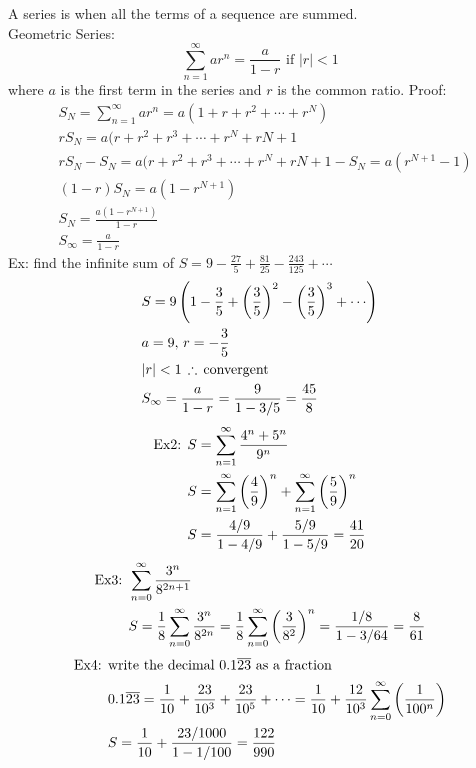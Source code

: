 \documentclass[11pt, fleqn]{article}
\begin{document}
A series is when all the terms of a sequence are summed.\\
Geometric Series:
$$\sum_{n=1}^\infty ar^n=\frac{a}{1-r}\text{ if $|r|<1$}$$
where $a$ is the first term in the series and $r$ is the common ratio.
Proof:
\begin{align*}
    &S_N=\sum_{n=1}^\infty ar^n=a(1+r+r^2+\cdots+r^N)\\
    &rS_N=a(r+r^2+r^3+\cdots+r^N+r{N+1}\\
    &rS_N-S_N=a(r+r^2+r^3+\cdots+r^N+r{N+1}-S_N=a(r^{N+1}-1)\\
    &(1-r)S_N=a(1-r^{N+1})\\
    &S_N=\frac{a(1-r^{N+1})}{1-r}\\
    &S_\infty=\frac{a}{1-r}
\end{align*}
Ex: find the infinite sum of ${S=9-\frac{27}{5}+\frac{81}{25}-\frac{243}{125}+\cdots}$
\begin{align*}
    &S=9\brround{1-\frac{3}{5}+\brround{\frac{3}{5}}^2-\brround{\frac{3}{5}}^3+\cdots}\\
    &a=9,\,r=-\frac{3}{5}\\
    &|r|<1\,\therefore\,\text{convergent}\\
    &S_\infty=\frac{a}{1-r}=\frac{9}{1-3/5}=\frac{45}{8}
\end{align*}
\begin{align*}
    \text{Ex2: }&S=\sum_{n=1}^\infty\frac{4^n+5^n}{9^n}\\
    &S=\sum_{n=1}^\infty\left( \frac{4}{9} \right)^n+\sum_{n=1}^\infty\left( \frac{5}{9} \right)^n\\
    &S=\frac{4/9}{1-4/9}+\frac{5/9}{1-5/9}=\frac{41}{20}
\end{align*}
\begin{align*}
    \text{Ex3: }&\sum_{n=0}^\infty\frac{3^n}{8^{2n+1}}\\
    &S=\frac{1}{8}\sum_{n=0}^\infty\frac{3^n}{8^{2n}}=\frac{1}{8}\sum_{n=0}^\infty\left( \frac{3}{8^2} \right)^n=\frac{1/8}{1-3/64}=\frac{8}{61}
\end{align*}
\begin{align*}
    \text{Ex4: }&\text{write the decimal $0.1\overline{23}$ as a fraction}\\
    &0.1\overline{23}=\frac{1}{10}+\frac{23}{10^3}+\frac{23}{10^5}+\cdots=\frac{1}{10}+\frac{12}{10^3}\sum_{n=0}^\infty\left( \frac{1}{100^n} \right)\\
    &S=\frac{1}{10}+\frac{23/1000}{1-1/100}=\frac{122}{990}
\end{align*}
\end{document}
